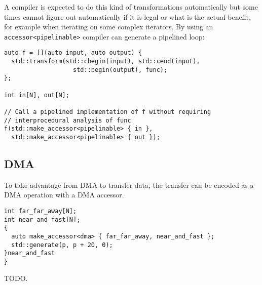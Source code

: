 \documentclass[a4paper]{article}
\begin{document}
A compiler is expected to do this kind of transformations
automatically but some times cannot figure out automatically if it is
legal or what is the actual benefit, for example when iterating on
some complex iterators. By using an \lstinline|accessor<pipelinable>|
compiler can generate a pipelined loop:
\begin{lstlisting}
auto f = [](auto input, auto output) {
  std::transform(std::cbegin(input), std::cend(input),
                   std::begin(output), func);
};

int in[N], out[N];

// Call a pipelined implementation of f without requiring
// interprocedural analysis of func
f(std::make_accessor<pipelinable> { in },
  std::make_accessor<pipelinable> { out });
\end{lstlisting}


\subsection{DMA}
\label{sec:dma}

To take advantage from DMA to transfer data, the transfer can be
encoded as a DMA operation with a DMA accessor.

\begin{lstlisting}
int far_far_away[N];
int near_and_fast[N];
{
  auto make_accessor<dma> { far_far_away, near_and_fast };
  std::generate(p, p + 20, 0);
}near_and_fast
}
\end{lstlisting}
TODO.




\end{document}
